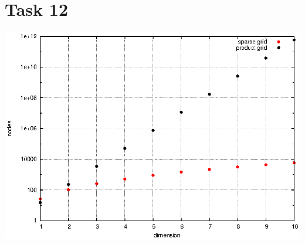 \documentclass[]{article}
\begin{document}
\section*{Task 12}
\includegraphics{task12}\\
\end{document}
